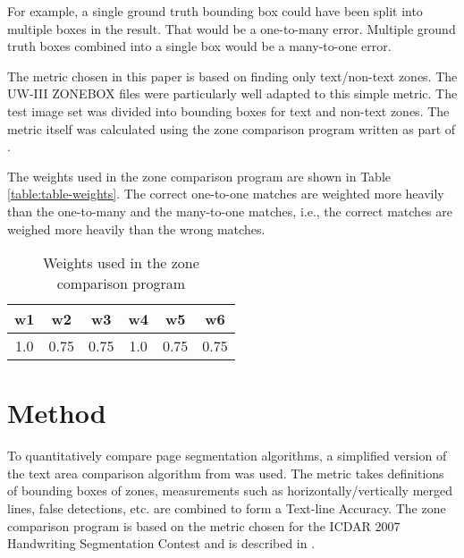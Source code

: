 \documentclass[conference]{IEEEtran}
\begin{document}
For example, a single ground truth bounding box could have been split into
multiple boxes in the result. That would be a one-to-many error. Multiple
ground truth boxes combined into a single box would be a many-to-one error.

The metric chosen in this paper is based on finding only text/non-text zones.
The UW-III ZONEBOX files were particularly well adapted to this simple
metric. The \cite{winder2010extending} test image set was divided into bounding
boxes for text and non-text zones.  The metric itself was calculated using the
zone comparison program written as part of \cite{winder2010extending}. 


The weights used in the zone comparison program are shown in Table
\ref{table:table-weights}. The correct one-to-one matches are weighted more
heavily than the one-to-many and the many-to-one matches, i.e., the correct
matches are weighed more heavily than the wrong matches.

\begin{table}
\begin{center}
\caption{Weights used in the zone comparison program}
\label{table:table-weights}
\label{table-weights}
\begin{tabular}{|c|c|c|c|c|c|}
\hline
  w1 & w2 & w3 & w4 & w5 & w6 \\
 \hline
  1.0  & 0.75 & 0.75 & 1.0 & 0.75 & 0.75 \\
\hline
\end{tabular}
\end{center}
\end{table}


\section{Method}

To quantitatively compare page segmentation algorithms, a simplified version of
the text area comparison algorithm from \cite{phillips1999empirical} was used.
The metric takes definitions of bounding boxes of zones, measurements such as
horizontally/vertically merged lines, false detections, etc. are combined to
form a Text-line Accuracy.  The zone comparison program is based on the
metric chosen for the ICDAR 2007 Handwriting Segmentation Contest and is
described in \cite{antonacopoulos2007page}.
\end{document}

